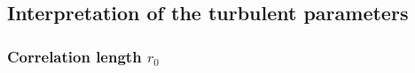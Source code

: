 \documentclass[fleqn,usenatbib, useAMS, a4paper]{mnras}
\newcounter{ionstage}
\renewcommand{\ion}[2]{\setcounter{ionstage}{#2}%
  \ensuremath{\mathrm{#1\,\scriptstyle\Roman{ionstage}}}}
\newcommand\hii{\ion{H}{2}}
\begin{document}




\subsection{Interpretation of the turbulent parameters}\label{sec:interpretation-parameters}

\subsubsection{Correlation length \(r_0\)}
\end{document}
